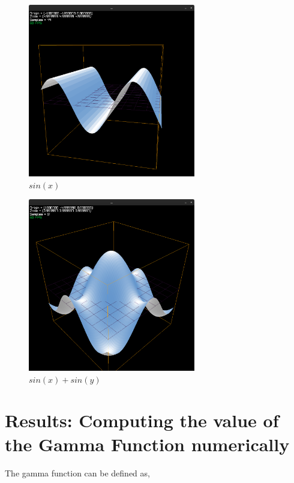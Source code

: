 \documentclass[12pt]{article}
\begin{document}
\begin{figure}
	\centering
	\includegraphics[width=0.65\textwidth]{example1.png}
	\caption{$sin(x)$}
	\label{fig:example1}
\end{figure}

\begin{figure}
	\centering
	\includegraphics[width=0.65\textwidth]{example2.png}
	\caption{$sin(x) + sin(y)$}
	\label{fig:example2}
\end{figure}

\pagebreak
\section{Results: Computing the value of the Gamma Function numerically}

The gamma function can be defined as,
\end{document}
